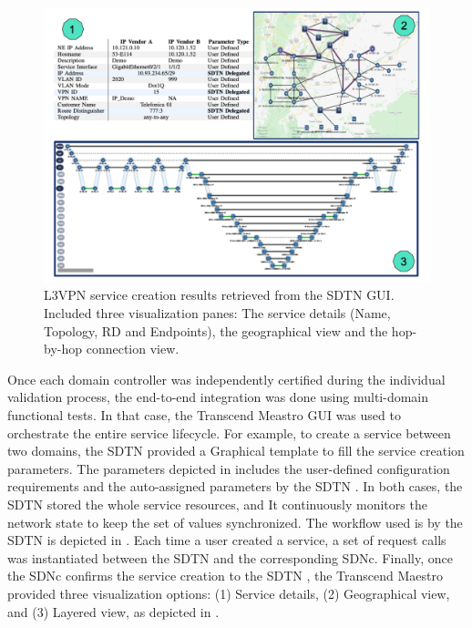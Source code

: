 \documentclass[10pt, conference]{IEEEtran}
\begin{document}
\begin{figure}
	\centering
		\includegraphics[width=\linewidth]{figs/diagram-14.png}
	\caption{L3VPN service creation results retrieved from the SDTN  GUI. Included three visualization panes: The service details (Name, Topology, RD and Endpoints), the geographical view and the hop-by-hop connection view.}
	\label{FIG:l3vpn_results}
\end{figure}


Once each domain controller was independently certified during the individual validation process, the end-to-end integration was done using multi-domain functional tests. In that case, the Transcend Meastro GUI was used to orchestrate the entire service lifecycle. For example,  to create a service between two domains, the SDTN  provided a Graphical template to fill the service creation parameters. The parameters depicted in  includes the user-defined configuration requirements and the auto-assigned parameters by the SDTN . In both cases, the SDTN  stored the whole service resources, and It continuously monitors the network state to keep the set of values synchronized. The workflow used is by the SDTN is depicted in . Each time a user created a service, a set of request calls was instantiated between the SDTN  and the corresponding SDNc. Finally, once the SDNc confirms the service creation to the SDTN , the Transcend Maestro provided three visualization options: (1) Service details, (2) Geographical view, and (3) Layered view, as depicted in .
\end{document}
